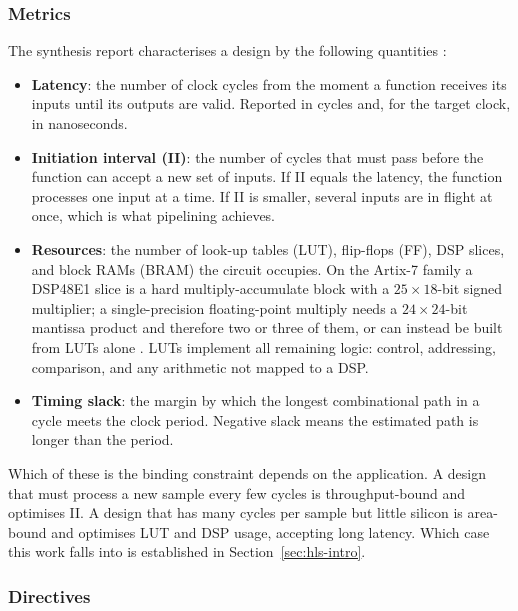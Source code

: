 \documentclass[12pt,a4paper]{article}
\begin{document}
\subsubsection{Metrics}
\label{sec:hls-metrics}

The synthesis report characterises a design by the following
quantities \citep{amd_ug1399}:

\begin{itemize}
  \item \textbf{Latency}: the number of clock cycles from the
        moment a function receives its inputs until its outputs are
        valid. Reported in cycles and, for the target clock, in
        nanoseconds.
  \item \textbf{Initiation interval (II)}: the number of cycles
        that must pass before the function can accept a new set of
        inputs. If II equals the latency, the function processes one
        input at a time. If II is smaller, several inputs are in
        flight at once, which is what pipelining achieves.
  \item \textbf{Resources}: the number of look-up tables (LUT),
        flip-flops (FF), DSP slices, and block RAMs (BRAM) the
        circuit occupies. On the Artix-7 family a DSP48E1 slice is a
        hard multiply-accumulate block with a $25\times18$-bit
        signed multiplier; a single-precision floating-point
        multiply needs a $24\times24$-bit mantissa product and
        therefore two or three of them, or can instead be built from
        LUTs alone \citep{amd_pg060_floating_point}. LUTs implement
        all remaining logic: control, addressing, comparison, and
        any arithmetic not mapped to a DSP.
  \item \textbf{Timing slack}: the margin by which the longest
        combinational path in a cycle meets the clock period.
        Negative slack means the estimated path is longer than the
        period.
\end{itemize}

Which of these is the binding constraint depends on the
application. A design that must process a new sample every few
cycles is throughput-bound and optimises II. A design that has many
cycles per sample but little silicon is area-bound and optimises
LUT and DSP usage, accepting long latency. Which case this work
falls into is established in Section~\ref{sec:hls-intro}.

\subsubsection{Directives}
\label{sec:hls-directives}
\end{document}
